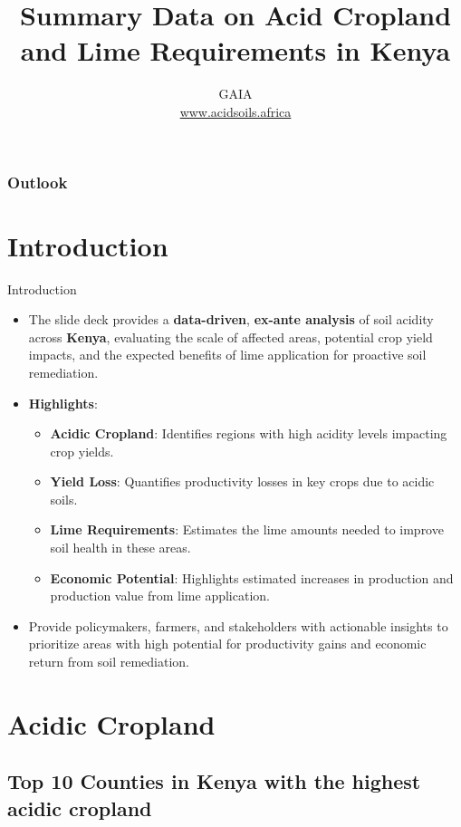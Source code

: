 \documentclass[xcolor=table, aspectratio=1610]{beamer}
\title[Kenya--Summary]{\textsf{Summary Data on Acid Cropland and Lime Requirements in Kenya}}
\author[GAIA]{GAIA\\ \href{www.acidsoils.africa}{www.acidsoils.africa} }
\institute[CIMMYT]
\begin{document}
\begin{frame}[plain]
\textsc{\titlepage}
\end{frame}

\begin{frame}
\frametitle{Outlook}
\tableofcontents 
\end{frame}

\section{Introduction}
\begin{frame}{Introduction}
    \begin{itemize}
        \item The slide deck provides a \textbf{data-driven}, \textbf{ex-ante analysis} of soil acidity across \textbf{Kenya}, evaluating the scale of affected areas, potential crop yield impacts, and the expected benefits of lime application for proactive soil remediation.
        \bigskip
        \item \textbf{Highlights}:
        \begin{itemize}
            \item \textbf{Acidic Cropland}: Identifies regions with high acidity levels impacting crop yields.
            \item \textbf{Yield Loss}: Quantifies productivity losses in key crops due to acidic soils.
            \item \textbf{Lime Requirements}: Estimates the lime amounts needed to improve soil health in these areas.
            \item \textbf{Economic Potential}: Highlights estimated increases in production and production value from lime application.
        \end{itemize}
        \bigskip
        \item Provide policymakers, farmers, and stakeholders with actionable insights to prioritize areas with high potential for productivity gains and economic return from soil remediation.
    \end{itemize}
\end{frame}
\section{Acidic Cropland}
\subsection*{Top 10 Counties in Kenya with the highest acidic cropland}
\end{document}
